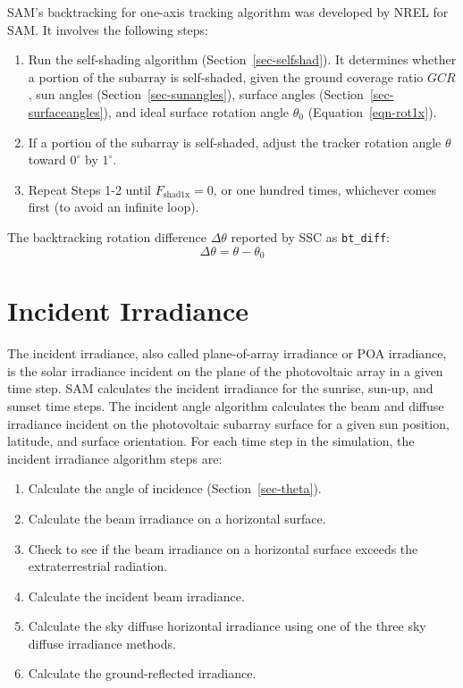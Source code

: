 \documentclass[12pt,letterpaper]{article}
\newcommand\GCR{\ensuremath{\mathit{GCR}}}
\begin{document}
SAM's backtracking for one-axis tracking algorithm was developed by NREL for SAM. It involves the following steps:
\begin{enumerate}
\item Run the self-shading algorithm (Section~\ref{sec-selfshad}). It determines whether a portion of the subarray is self-shaded, given the ground coverage ratio $\GCR$, sun angles (Section~\ref{sec-sunangles}), surface angles (Section~\ref{sec-surfaceangles}), and ideal surface rotation angle $\theta_0$ (Equation~\ref{eqn-rot1x}).
\item If a portion of the subarray is self-shaded, adjust the tracker rotation angle $\theta$ toward $0^\circ$ by $1^\circ$.
\item Repeat Steps 1-2 until $F_{\mathrm{shad1x}}=0$, or one hundred times, whichever comes first (to avoid an infinite loop).
\end{enumerate}

The backtracking rotation difference $\Delta\theta$ reported by SSC as \texttt{bt\_diff}:
\begin{equation}
\Delta\theta = \theta - \theta_0
\end{equation}

\chapter{Incident Irradiance}\label{sec-incidentirradiance}

The incident irradiance, also called plane-of-array irradiance or POA irradiance, is the solar irradiance incident on the plane of the photovoltaic array in a given time step. SAM calculates the incident irradiance for the sunrise, sun-up, and sunset time steps. The incident angle algorithm calculates the beam and diffuse irradiance incident on the photovoltaic subarray surface for a given sun position, latitude, and surface orientation. For each time step in the simulation, the incident irradiance algorithm steps are:

\begin{enumerate}
\item Calculate the angle of incidence (Section~\ref{sec-theta}).
\item Calculate the beam irradiance on a horizontal surface.
\item Check to see if the beam irradiance on a horizontal surface exceeds the extraterrestrial radiation.
\item Calculate the incident beam irradiance.
\item Calculate the sky diffuse horizontal irradiance using one of the three sky diffuse irradiance methods.
\item Calculate the ground-reflected irradiance.
\end{enumerate}
\end{document}
